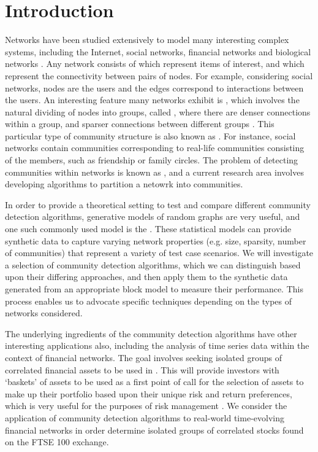 
\chapter{Introduction}

\label{cha:introduction}


Networks have been studied extensively to model many interesting complex systems, including the Internet, social networks, financial networks and biological networks \cite{New06a,DKM+13,MG13}.
Any network consists of  which represent items of interest, and  which represent the connectivity between pairs of nodes.
For example, considering social networks, nodes are the users and the edges correspond to interactions between the users.
An interesting feature many networks exhibit is , which involves the natural dividing of nodes into groups, called , where there are denser connections within a group, and sparser connections between different groups \cite{New06a,DKM+13,For10,New06b}.
This particular type of community structure is also known as  \cite{DKM+13}.
For instance, social networks contain communities corresponding to real-life communities consisting of the members, such as friendship or family circles.
The problem of detecting communities within networks is known as , and a current research area involves developing algorithms to partition a netowrk into communities.

In order to provide a theoretical setting to test and compare different community detection algorithms, generative models of random graphs are very useful, and one such commonly used model is the  \cite{DKM+13,NN12}.
These statistical models can provide synthetic data to capture varying network properties (e.g. size, sparsity, number of communities) that represent a variety of test case scenarios.
We will investigate a selection of community detection algorithms, which we can distinguish based upon their differing approaches, and then apply them to the synthetic data generated from an appropriate block model to measure their performance.
This process enables us to advocate specific techniques depending on the types of networks considered.

The underlying ingredients of the community detection algorithms have other interesting applications also, including the analysis of time series data within the context of financial networks.
The goal involves seeking isolated groups of correlated financial assets to be used in .
This will provide investors with `baskets' of assets to be used as a first point of call for the selection of assets to make up their portfolio based upon their unique risk and return preferences, which is very useful for the purposes of risk management \cite{MG13}.
We consider the application of community detection algorithms to real-world time-evolving financial networks in order determine isolated groups of correlated stocks found on the FTSE 100 exchange.

